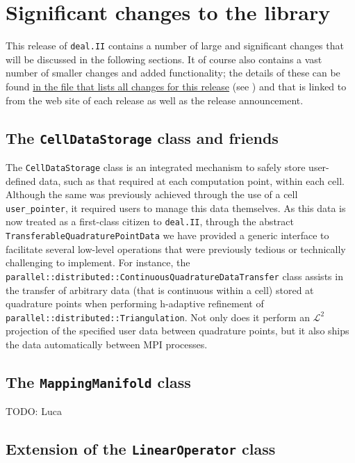 \documentclass{ansarticle-preprint}
\newcommand{\specialword}[1]{\texttt{#1}}
\newcommand{\dealii}{{\specialword{deal.II}}}
\begin{document}
\section{Significant changes to the library}

This release of \dealii{} contains a number of large and significant changes
that will be discussed in the following sections. It of course also contains a
vast number of smaller changes and added functionality; the details of these
can be found
\href{https://www.dealii.org/8.5.0/doxygen/deal.II/changes_between_8_4_and_8_5.html}{in the file that lists all changes for this release} (see \cite{changes85})
and that is linked to from the web site of each release as well as the
release announcement.


\subsection{The \texttt{CellDataStorage} class and friends}

The \texttt{CellDataStorage} class is an integrated mechanism to safely store user-defined data, such as that required at each computation point, within each cell.
Although the same was previously achieved through the use of a cell \texttt{user\_pointer}, it required users to manage this data themselves.
As this data is now treated as a first-class citizen to \dealii{}, through the abstract \texttt{TransferableQuadraturePointData} we have provided a generic interface to facilitate several low-level operations that were previously tedious or technically challenging to implement.
For instance, the \texttt{parallel::distributed::ContinuousQuadratureDataTransfer} class assists in the transfer of arbitrary data (that is continuous within a cell) stored at quadrature points when performing h-adaptive refinement of \texttt{parallel::distributed::Triangulation}.
Not only does it perform an $\mathcal{L}^2$ projection of the specified user data between quadrature points, but it also ships the data automatically between MPI processes.

\subsection{The \texttt{MappingManifold} class}

TODO: Luca

\subsection{Extension of the \texttt{LinearOperator} class}
\end{document}
